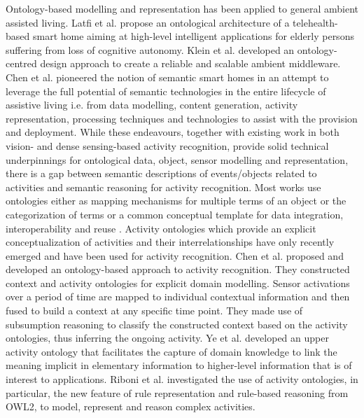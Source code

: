 Ontology-based modelling and representation has been applied to general ambient assisted living. Latfi et al. \cite{Latfi2007} propose an ontological architecture of a telehealth-based smart home aiming at high-level intelligent applications for elderly persons suffering from loss of cognitive autonomy. Klein et al. \cite{Klein2007} developed an ontology-centred design approach to create a reliable and scalable ambient middleware. Chen et al. \cite{Chen2009} pioneered the notion of semantic smart homes in an attempt to leverage the full potential of semantic technologies in the entire lifecycle of assistive living i.e. from data modelling, content generation, activity representation, processing techniques and technologies to assist with the provision and deployment. While these endeavours, together with existing work in both vision- and dense sensing-based activity recognition, provide solid technical underpinnings for ontological data, object, sensor modelling and representation, there is a gap between semantic descriptions of events/objects related to activities and semantic reasoning for activity recognition. Most works use ontologies either as mapping mechanisms for multiple terms of an object \cite{Tapia2006} or the categorization of terms \cite{Yamada2007} or a common conceptual template for data integration, interoperability and reuse \cite{Latfi2007} \cite{Klein2007} \cite{Chen2009}. Activity ontologies which provide an explicit conceptualization of activities and their interrelationships have only recently emerged and have been used for activity recognition. Chen et al. \cite{Chen2009b} \cite{Chen2012a} proposed and developed an ontology-based approach to activity recognition. They constructed context and activity ontologies for explicit domain modelling. Sensor activations over a period of time are mapped to individual contextual information and then fused to build a context at any specific time point. They made use of subsumption reasoning to classify the constructed context based on the activity ontologies, thus inferring the ongoing activity. Ye et al. \cite{Ye2011} developed an upper activity ontology that facilitates the capture of domain knowledge to link the meaning implicit in elementary information to higher-level information that is of interest to applications. Riboni et al. \cite{Riboni2011b} investigated the use of activity ontologies, in particular, the new feature of rule representation and rule-based reasoning from OWL2, to model, represent and reason complex activities.


